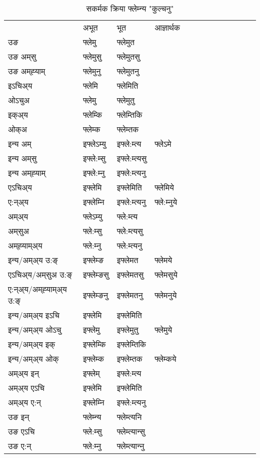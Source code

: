 \begin{table}[H]
\centering
\caption{\label{em.vt} सकर्मक क्रिया  फ्लेम्‍न्य  "कुल्चनु"  }
\begin{tabular}{l|l|l|l|l|l|l|l|l|l|l|l|l}  \toprule
&अभूत & भूत & आज्ञार्थक \\ 
उङ &फ्लेमु &फ्लेमुत \\ 
उङ अम्‌सु &फ्लेमुसु &फ्लेमुतसु \\ 
उङ अम्‌ह्‍याम् &फ्लेमुनु &फ्लेमुतनु \\ 
इऽचिअ्य &फ्लेमि &फ्लेमिति   \\ 
ओऽचुअ &फ्लेमु &फ्लेमुतु   \\ 
इक्अ्य &फ्लेम्कि &फ्लेम्तिकि   \\ 
ओक्अ &फ्लेम्क &फ्लेम्तक   \\ 
इन्य अम् & इफ्लेऽम्यु  & इफ्ले:म्त्य &फ्लेऽमे  \\ 
इन्य अम्‌सु & इफ्ले:म्सु  & इफ्ले:म्त्यसु   \\ 
इन्य अम्‌ह्‍याम् & इफ्ले:म्‍नु  & इफ्ले:म्त्यनु   \\ 
एऽचिअ्य & इफ्लेमि & इफ्लेमिति &फ्लेमिये    \\ 
ए:न्अ्य & इफ्लेम्‍नि  & इफ्ले:म्त्यनु &फ्ले:म्‍नुये  \\ 
अम्अ्य & फ्लेऽम्यु  & फ्ले:म्त्य  \\ 
अम्‌सुअ & फ्ले:म्सु & फ्ले:म्त्यसु  \\ 
अम्‌ह्‍याम्अ्य & फ्ले:म्‍नु  & फ्ले:म्त्यनु \\ 
\midrule
इन्य/अम्अ्य उ:ङ्‌&इफ्लेम्ङ & इफ्लेमत &फ्लेमये \\ 
एऽचिअ्य/अम्‌सुअ उ:ङ्‌ &इफ्लेम्ङसु & इफ्लेमतसु &फ्लेमसुये \\ 
ए:न्अ्य/अम्‌ह्‍याम्अ्य उ:ङ्‌ &इफ्लेम्ङनु & इफ्लेमतनु &फ्लेमनुये \\ 
इन्य/अम्अ्य इऽचि & इफ्लेमि & इफ्लेमिति    \\ 
इन्य/अम्अ्य ओऽचु & इफ्लेमु & इफ्लेमुतु  &फ्लेमुये  \\ 
इन्य/अम्अ्य इक् & इफ्लेम्कि & इफ्लेम्तिकि   \\ 
इन्य/अम्अ्य ओक् & इफ्लेम्क & इफ्लेम्तक  &फ्लेम्कये  \\ 
अम्अ्य इन् & इफ्लेम् & इफ्ले:म्त्य   \\ 
अम्अ्य एऽचि & इफ्लेमि & इफ्लेमिति    \\ 
अम्अ्य ए:न् & इफ्लेम्‍नि  & इफ्ले:म्त्यनु  \\ 
\midrule
उङ इन् & फ्लेम्‍न्य  & फ्लेम्त्यनि  \\ 
उङ एऽचि & फ्ले:म्सु  & फ्लेम्त्यान्सु   \\ 
उङ ए:न्& फ्ले:म्‍नु  & फ्लेम्त्यान्‍नु   \\ 
\bottomrule
\end{tabular}
\end{table}


